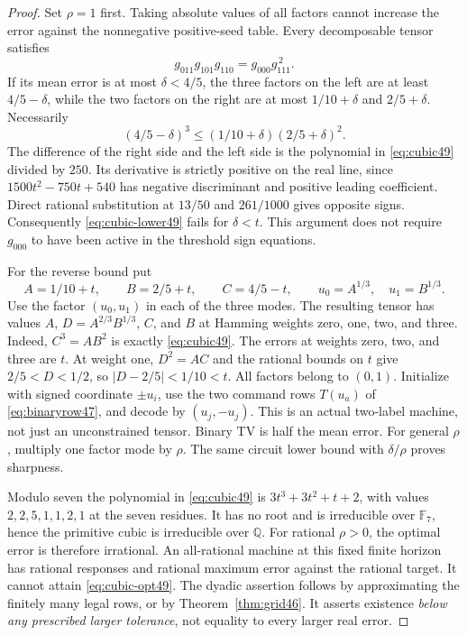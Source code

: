 \begin{proof}
Set $\rho=1$ first. Taking absolute values of all factors cannot
increase the error against the nonnegative positive-seed table.
Every decomposable tensor satisfies
\begin{equation}\label{eq:cubic-circuit49}
 g_{011}g_{101}g_{110}=g_{000}g_{111}^{\,2}.
\end{equation}
If its mean error is at most $\delta<4/5$, the three factors on the
left are at least $4/5-\delta$, while the two factors on the right
are at most $1/10+\delta$ and $2/5+\delta$. Necessarily
\begin{equation}\label{eq:cubic-lower49}
 (4/5-\delta)^3\le(1/10+\delta)(2/5+\delta)^2.
\end{equation}
The difference of the right side and the left side is the polynomial
in \eqref{eq:cubic49} divided by $250$. Its derivative is strictly
positive on the real line, since $1500t^2-750t+540$ has negative
discriminant and positive leading coefficient. Direct rational
substitution at $13/50$ and $261/1000$ gives opposite signs.
Consequently \eqref{eq:cubic-lower49} fails for $\delta<t$.
This argument does not require $g_{000}$ to have been active in the
threshold sign equations.

For the reverse bound put
\[
 A=1/10+t,\qquad B=2/5+t,\qquad C=4/5-t,\qquad
 u_0=A^{1/3},\quad u_1=B^{1/3}.
\]
Use the factor $(u_0,u_1)$ in each of the three modes. The resulting
tensor has values $A$, $D=A^{2/3}B^{1/3}$, $C$, and $B$ at Hamming
weights zero, one, two, and three. Indeed, $C^3=AB^2$ is exactly
\eqref{eq:cubic49}. The errors at weights zero, two, and three are
$t$. At weight one, $D^2=AC$ and the rational bounds on $t$ give
$2/5<D<1/2$, so $|D-2/5|<1/10<t$.
All factors belong to $(0,1)$.
Initialize with signed coordinate $\pm u_i$, use the two command
rows $T(u_a)$ of \eqref{eq:binaryrow47}, and decode by
$(u_j,-u_j)$. This is an actual two-label machine, not just an
unconstrained tensor. Binary TV is half the mean error.
For general $\rho$, multiply one factor mode by $\rho$.
The same circuit lower bound with $\delta/\rho$ proves sharpness.

Modulo seven the polynomial in \eqref{eq:cubic49} is
$3t^3+3t^2+t+2$, with values $2,2,5,1,1,2,1$ at the seven residues.
It has no root and is irreducible over $\mathbb F_7$, hence the
primitive cubic is irreducible over $\mathbb Q$.
For rational $\rho>0$, the optimal error is therefore irrational.
An all-rational machine at this fixed finite horizon has rational
responses and rational maximum error against the rational target.
It cannot attain \eqref{eq:cubic-opt49}.
The dyadic assertion follows by approximating the finitely many
legal rows, or by Theorem~\ref{thm:grid46}. It asserts existence
\emph{below any prescribed larger tolerance}, not equality to every
larger real error.
\end{proof}

